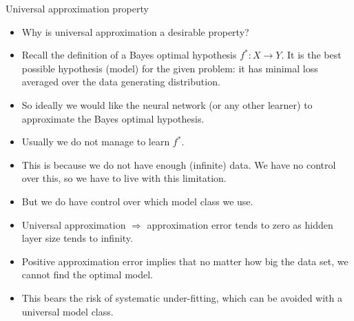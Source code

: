 \begin{vbframe}{Universal approximation property}
  \begin{itemize}
  \item Why is universal approximation a desirable property?
  \vspace{2mm}
  \item Recall the definition of a Bayes optimal hypothesis $f^* : X \to Y$.
    It is the best possible hypothesis (model) for the given problem:
    it has minimal loss averaged over the data generating distribution.
  \vspace{2mm}
  \item So ideally we would like the neural network (or any other
    learner) to approximate the Bayes optimal hypothesis.
  \vspace{2mm}
  \item Usually we do not manage to learn $f^*$.
  \vspace{2mm}
  \item This is because we do not have enough (infinite) data. We have
    no control over this, so we have to live with this limitation.
  \vspace{2mm}
  \item But we do have control over which model class we use.
  \end{itemize}

  \framebreak

  \begin{itemize}
    \vspace{10mm}
    \item Universal approximation $\Rightarrow$ approximation error tends
    to zero as hidden layer size tends to infinity.
    \vspace{5mm}
    \item Positive approximation error implies that no matter  how %
    big the data set, we cannot find the optimal model.
    \vspace{5mm}
    \item This bears the risk of systematic under-fitting, which can be avoided with a universal model class.
  \end{itemize}

  \framebreak


\end{vbframe}
